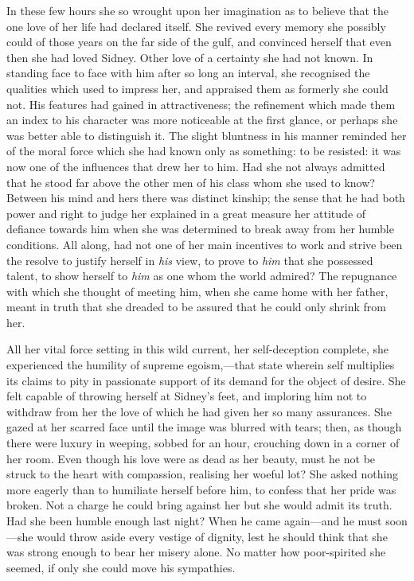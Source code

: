 In these few hours she so wrought upon her imagination as to believe
that the one love of her life had declared itself. She revived every
memory she possibly could of those years on the far side of the gulf,
and convinced herself that even then she had loved Sidney. Other love of
a certainty she had not known. In standing face to face with him after
so long an interval, she recognised the qualities which used to impress
her, and appraised them as formerly she could not. His features had
gained in attractiveness; the refinement which made them an index to his
character was more noticeable at the first glance, or perhaps she was
better able to distinguish it. The slight bluntness in his manner
reminded her of the moral force which she had known only as something:
to be resisted: it was now one of the influences that drew her to him.
Had she not always admitted that he stood far above the other men of his
class whom she {\protect\hypertarget{103}{}{}}used to know? Between his
mind and hers there was distinct kinship; the sense that he had both
power and right to judge her explained in a great measure her attitude
of defiance towards him when she was determined to break away from her
humble conditions. All along, had not one of her main incentives to work
and strive been the resolve to justify herself in \emph{his} view, to
prove to \emph{him} that she possessed talent, to show herself to
\emph{him} as one whom the world admired? The repugnance with which she
thought of meeting him, when she came home with her father, meant in
truth that she dreaded to be assured that he could only shrink from her.

All her vital force setting in this wild current, her self-deception
complete, she experienced the humility of supreme egoism,---that state
wherein self multiplies its claims to pity in passionate support of its
demand for the object of desire. She felt capable of throwing herself at
Sidney's feet, and imploring him not to withdraw from her the love of
which he had given her so many assurances. She gazed at her scarred face
until the image was blurred with tears; then, as though there were
luxury {\protect\hypertarget{104}{}{}}in weeping, sobbed for an hour,
crouching down in a corner of her room. Even though his love were as
dead as her beauty, must he not be struck to the heart with compassion,
realising her woeful lot? She asked nothing more eagerly than to
humiliate herself before him, to confess that her pride was broken. Not
a charge he could bring against her but she would admit its truth. Had
she been humble enough last night? When he came again---and he must
soon---she would throw aside every vestige of dignity, lest he should
think that she was strong enough to bear her misery alone. No matter how
poor-spirited she seemed, if only she could move his sympathies.

